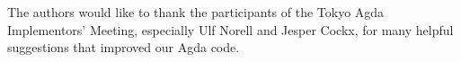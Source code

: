 \documentclass[sigplan,review]{acmart}\settopmatter{printfolios=true,printccs=false,printacmref=false}
\begin{document}
\begin{acks}                            %
 The authors would like to thank the participants of the Tokyo Agda 
 Implementors' Meeting, especially Ulf Norell and Jesper Cockx,
 for many helpful suggestions that improved our Agda code.
\end{acks}



\end{document}
